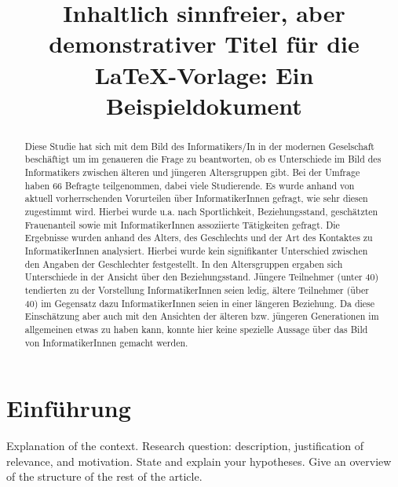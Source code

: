 \documentclass[de]{agse-empir-report}\usepackage[]{graphicx}\usepackage[]{color}
\begin{document}
\title{Inhaltlich sinnfreier, aber demonstrativer Titel für die
    \LaTeX-Vorlage: Ein Beispieldokument}
\author{
    \and
    \and
    \and
    \and
}

\maketitle



\begin{abstract}
    \lipsum[1] Diese Studie hat sich mit dem Bild des Informatikers/In in der modernen Geselschaft beschäftigt um im genaueren die Frage zu beantworten, ob es Unterschiede im Bild des Informatikers zwischen älteren und jüngeren Altersgruppen gibt. Bei der Umfrage haben 66 Befragte teilgenommen, dabei viele Studierende. Es wurde anhand von aktuell vorherrschenden Vorurteilen über InformatikerInnen gefragt, wie sehr diesen zugestimmt wird. Hierbei wurde u.a. nach Sportlichkeit, Beziehungsstand, geschätzten Frauenanteil sowie mit InformatikerInnen assoziierte Tätigkeiten gefragt. Die Ergebnisse wurden anhand des Alters, des Geschlechts und der Art des Kontaktes zu InformatikerInnen analysiert. Hierbei wurde kein signifikanter Unterschied zwischen den Angaben der Geschlechter festgestellt. In den Altersgruppen ergaben sich Unterschiede in der Ansicht über den Beziehungsstand. Jüngere Teilnehmer (unter 40) tendierten zu der Vorstellung InformatikerInnen seien ledig, ältere Teilnehmer (über 40) im Gegensatz dazu InformatikerInnen seien in einer längeren Beziehung. Da diese Einschätzung aber auch mit den Ansichten der älteren bzw. jüngeren Generationen im allgemeinen etwas zu haben kann, konnte hier keine spezielle Aussage über das Bild von InformatikerInnen gemacht werden. 
\end{abstract}


\section[fz]{Einführung}
Explanation of the context.
Research question: description, justification of relevance,
and motivation.
State and explain your hypotheses.
Give an overview of the structure of the rest of the article.
\end{document}
